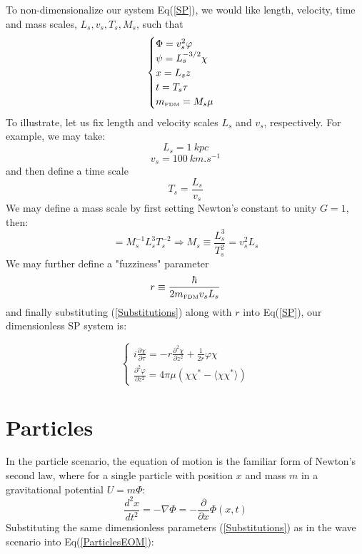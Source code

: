 \documentclass[oneside]{book}
\newcommand{\pd}{\partial}
\begin{document}
To non-dimensionalize our system Eq(\ref{SP}), we would like length, velocity, time and mass scales, $L_s, v_s,T_s,M_s$, such that
\begin{equation}
    \begin{cases}
    \Phi = v_s^2 \varphi\\
    \psi = L_s^{-3/2} \chi\\
    x = L_s z\\
    t = T_s \tau\\
    m_\text{\tiny{FDM}} = M_s \mu
    \end{cases}
    \label{Substitutions}
\end{equation}
To illustrate, let us fix length and velocity scales $L_s$ and $v_s$, respectively. For example, we may take:
$$L_s = \SI{1}{kpc} $$
$$v_s = \SI{100}{km.s^{-1}}$$
and then define a time scale 
\begin{equation}
T_s  = \frac{L_s}{v_s}
\label{T_scale}
\end{equation}
We may define a mass scale by first setting Newton's constant to unity $G = 1$, then:
\begin{equation}
[G] = M_s^{-1} L_s^3 T_s^{-2} \Rightarrow M_s \equiv \frac{L_s^3}{T_s^2} = v_s^2 L_s 
\label{M_scale}
\end{equation}
We may further define a "fuzziness" parameter 
\begin{equation}
r \equiv \frac{\hbar}{2 m_\text{\tiny{FDM}} v_s L_s}
\label{Fuzziness Param}
\end{equation}
and finally substituting (\ref{Substitutions}) along with $r$ into Eq(\ref{SP}), our dimensionless SP system is:

\begin{equation}
    \begin{cases}
    i\frac{\pd \chi}{\pd \tau} = -r\frac{\pd^2 \chi}{\pd z^2} + \frac{1}{2r}\varphi\chi \\
    
    \frac{\pd^2 \varphi}{\pd z^2} = 4\pi\mu (\chi\chi^* - \langle\chi\chi^*\rangle)
    \end{cases}
    \label{SP-NonDim}
\end{equation}



\section{Particles}
In the particle scenario, the equation of motion is the familiar form of Newton's second law, where for a single particle with position $x$ and mass $m$ in a gravitational potential $U = m\Phi$:
\begin{equation}
    \frac{d^2 x}{d t^2} = -\nabla\Phi = -\frac{\pd}{\pd x}\Phi(x,t)
    \label{ParticlesEOM}
\end{equation}
Substituting the same dimensionless parameters (\ref{Substitutions}) as in the wave scenario into Eq(\ref{ParticlesEOM}):
\end{document}
